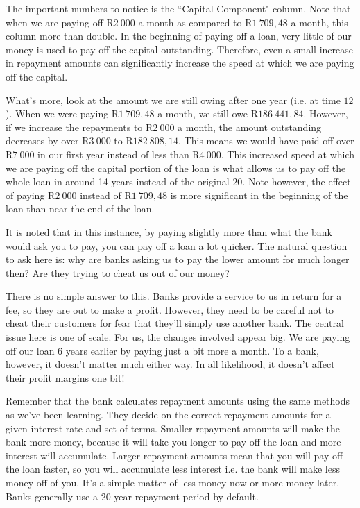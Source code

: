 The important numbers to notice is the ``Capital Component" column. Note that when we are paying off R$2~000$ a month as compared to R$1~709,48$ a month, this column more than double. In the beginning of paying off a loan, very little of our money is used to pay off the capital outstanding. Therefore, even a small increase in repayment amounts can significantly increase the speed at which we are paying off the capital.

What's more, look at the amount we are still owing after one year (i.e.\@{} at time $12$). When we were paying R$1~709,48$ a month, we still owe R$186~441,84$. However, if we increase the repayments to R$2~000$ a month, the amount outstanding decreases by over R$3~000$ to R$182~808,14$. This means we would have paid off over R$7~000$ in our first year instead of less than R$4~000$. This increased speed at which we are paying off the capital portion of the loan is what allows us to pay off the whole loan in around 14 years instead of the original $20$. Note however, the effect of paying R$2~000$ instead of R$1~709,48$ is more significant in the beginning of the loan than near the end of the loan.

It is noted that in this instance, by paying slightly more than what the bank would ask you to pay, you can pay off a loan a lot quicker. The natural question to ask here is: why are banks asking us to pay the lower amount for much longer then? Are they trying to cheat us out of our money?

There is no simple answer to this. Banks provide a service to us in return for a fee, so they are out to make a profit. However, they need to be careful not to cheat their customers for fear that they'll simply use another bank. The central issue here is one of scale. For us, the changes involved appear big. We are paying off our loan 6 years earlier by paying just a bit more a month. To a bank, however, it doesn't matter much either way. In all likelihood, it doesn't affect their profit margins one bit!

Remember that the bank calculates repayment amounts using the same methods as we've been learning. They decide on the correct repayment amounts for a given interest rate and set of terms. Smaller repayment amounts will make the bank more money, because it will take you longer to pay off the loan and more interest will accumulate. Larger repayment amounts mean that you will pay off the loan faster, so you will accumulate less interest i.e.\@{} the bank will make less money off of you. It's a simple matter of less money now or more money later. Banks generally use a 20 year repayment period by default.

